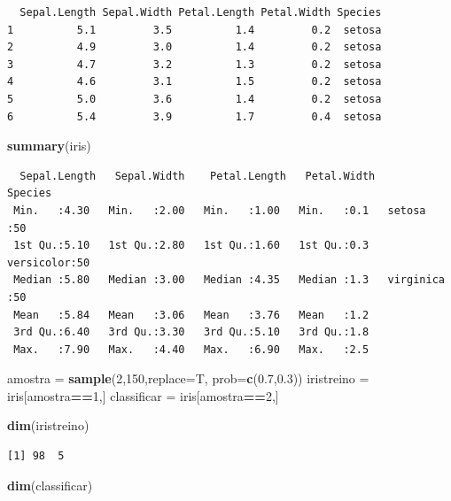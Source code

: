 \documentclass[12pt,brazil,oneside]{book}
\newenvironment{Shaded}{\begin{snugshade}}{\end{snugshade}}
\newcommand{\DataTypeTok}[1]{\textcolor[rgb]{0.13,0.29,0.53}{#1}}
\newcommand{\DecValTok}[1]{\textcolor[rgb]{0.00,0.00,0.81}{#1}}
\newcommand{\FloatTok}[1]{\textcolor[rgb]{0.00,0.00,0.81}{#1}}
\newcommand{\KeywordTok}[1]{\textcolor[rgb]{0.13,0.29,0.53}{\textbf{#1}}}
\newcommand{\NormalTok}[1]{#1}
\newcommand{\OperatorTok}[1]{\textcolor[rgb]{0.81,0.36,0.00}{\textbf{#1}}}
\newcommand{\StringTok}[1]{\textcolor[rgb]{0.31,0.60,0.02}{#1}}
\begin{document}
\begin{verbatim}
  Sepal.Length Sepal.Width Petal.Length Petal.Width Species
1          5.1         3.5          1.4         0.2  setosa
2          4.9         3.0          1.4         0.2  setosa
3          4.7         3.2          1.3         0.2  setosa
4          4.6         3.1          1.5         0.2  setosa
5          5.0         3.6          1.4         0.2  setosa
6          5.4         3.9          1.7         0.4  setosa
\end{verbatim}

\begin{Shaded}
\begin{Highlighting}[]
\KeywordTok{summary}\NormalTok{(iris)}
\end{Highlighting}
\end{Shaded}

\begin{verbatim}
  Sepal.Length   Sepal.Width    Petal.Length   Petal.Width        Species  
 Min.   :4.30   Min.   :2.00   Min.   :1.00   Min.   :0.1   setosa    :50  
 1st Qu.:5.10   1st Qu.:2.80   1st Qu.:1.60   1st Qu.:0.3   versicolor:50  
 Median :5.80   Median :3.00   Median :4.35   Median :1.3   virginica :50  
 Mean   :5.84   Mean   :3.06   Mean   :3.76   Mean   :1.2                  
 3rd Qu.:6.40   3rd Qu.:3.30   3rd Qu.:5.10   3rd Qu.:1.8                  
 Max.   :7.90   Max.   :4.40   Max.   :6.90   Max.   :2.5                  
\end{verbatim}

\begin{Shaded}
\begin{Highlighting}[]
\NormalTok{amostra =}\StringTok{ }\KeywordTok{sample}\NormalTok{(}\DecValTok{2}\NormalTok{,}\DecValTok{150}\NormalTok{,}\DataTypeTok{replace=}\NormalTok{T, }\DataTypeTok{prob=}\KeywordTok{c}\NormalTok{(}\FloatTok{0.7}\NormalTok{,}\FloatTok{0.3}\NormalTok{))}
\NormalTok{iristreino =}\StringTok{ }\NormalTok{iris[amostra}\OperatorTok{==}\DecValTok{1}\NormalTok{,]}
\NormalTok{classificar =}\StringTok{ }\NormalTok{iris[amostra}\OperatorTok{==}\DecValTok{2}\NormalTok{,]}

\KeywordTok{dim}\NormalTok{(iristreino)}
\end{Highlighting}
\end{Shaded}

\begin{verbatim}
[1] 98  5
\end{verbatim}

\begin{Shaded}
\begin{Highlighting}[]
\KeywordTok{dim}\NormalTok{(classificar)}
\end{Highlighting}
\end{Shaded}
\end{document}
